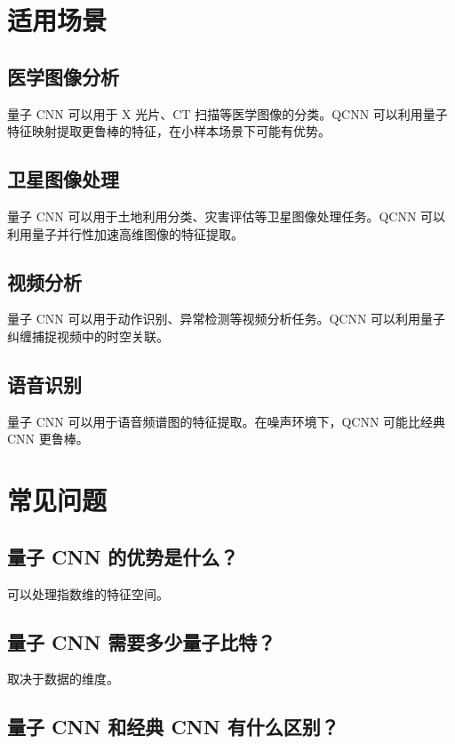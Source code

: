 \documentclass[12pt,a4paper]{article}
\begin{document}
\section{适用场景}

\subsection{医学图像分析}

量子 CNN 可以用于 X 光片、CT 扫描等医学图像的分类。QCNN 可以利用量子特征映射提取更鲁棒的特征，在小样本场景下可能有优势。

\subsection{卫星图像处理}

量子 CNN 可以用于土地利用分类、灾害评估等卫星图像处理任务。QCNN 可以利用量子并行性加速高维图像的特征提取。

\subsection{视频分析}

量子 CNN 可以用于动作识别、异常检测等视频分析任务。QCNN 可以利用量子纠缠捕捉视频中的时空关联。

\subsection{语音识别}

量子 CNN 可以用于语音频谱图的特征提取。在噪声环境下，QCNN 可能比经典 CNN 更鲁棒。

\section{常见问题}

\subsection{量子 CNN 的优势是什么？}

可以处理指数维的特征空间。

\subsection{量子 CNN 需要多少量子比特？}

取决于数据的维度。

\subsection{量子 CNN 和经典 CNN 有什么区别？}
\end{document}
